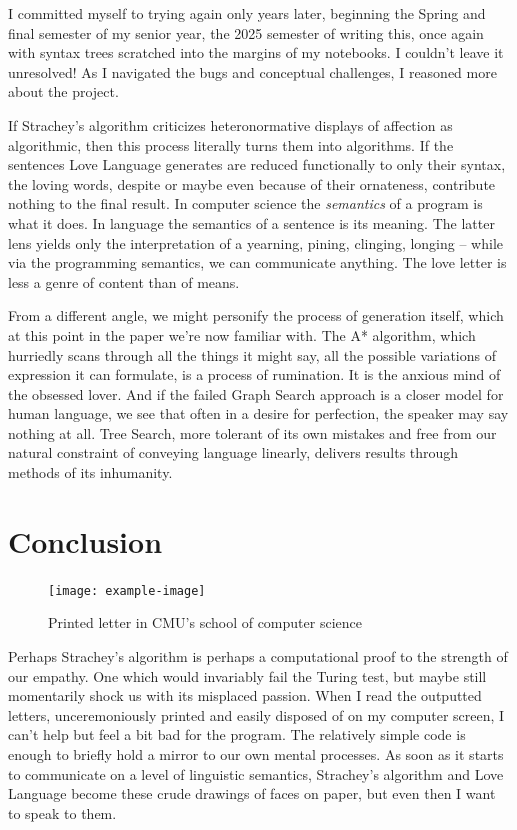 \documentclass[runningheads]{llncs}
\begin{document}
I committed myself to trying again only years later, beginning the Spring and final semester of my senior year, the 2025 semester of writing this, once again with syntax trees scratched into the margins of my notebooks. I couldn't leave it unresolved! As I navigated the bugs and conceptual challenges, I reasoned more about the project.

If Strachey's algorithm criticizes heteronormative displays of affection as algorithmic, then this process literally turns them into algorithms. If the sentences Love Language generates are reduced functionally to only their syntax, the loving words, despite or maybe even because of their ornateness, contribute nothing to the final result. In computer science the \textit{semantics} of a program is what it does. In language the semantics of a sentence is its meaning. The latter lens yields only the interpretation of a yearning, pining, clinging, longing -- while via the programming semantics, we can communicate anything. The love letter is less a genre of content than of means.

From a different angle, we might personify the process of generation itself, which at this point in the paper we're now familiar with. The A* algorithm, which hurriedly scans through all the things it might say, all the possible variations of expression it can formulate, is a process of rumination. It is the anxious mind of the obsessed lover. And if the failed Graph Search approach is a closer model for human language, we see that often in a desire for perfection, the speaker may say nothing at all. Tree Search, more tolerant of its own mistakes and free from our natural constraint of conveying language linearly, delivers results through methods of its inhumanity.

\section{Conclusion}
\begin{figure}
\vspace{-5em}
  \begin{center}
    \texttt{[image: example-image]}
  \end{center}
\vspace{-1em}
  \caption{Printed letter in CMU's school of computer science}
\vspace{-2em}
\end{figure}
Perhaps Strachey’s algorithm is perhaps a computational proof to the strength of our empathy. One which would invariably fail the Turing test, but maybe still momentarily shock us with its misplaced passion. When I read the outputted letters, unceremoniously printed and easily disposed of on my computer screen, I can’t help but feel a bit bad for the program. The relatively simple code is enough to briefly hold a mirror to our own mental processes. As soon as it starts to communicate on a level of linguistic semantics, Strachey’s algorithm and Love Language become these crude drawings of faces on paper, but even then I want to speak to them.
\end{document}
